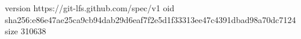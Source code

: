 version https://git-lfs.github.com/spec/v1
oid sha256:e86e47ae25ca9cb94dab29d6eaf7f2e5d1f33313ee47c4391dbad98a70dc7124
size 310638
